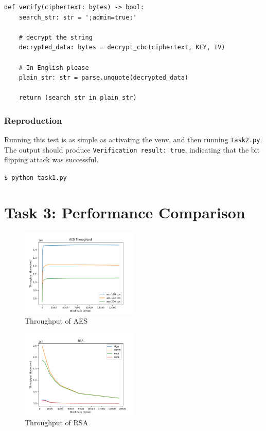 \documentclass[11pt]{article}
\begin{document}
\begin{framed}
\begin{verbatim}
def verify(ciphertext: bytes) -> bool:
    search_str: str = ';admin=true;'

    # decrypt the string  
    decrypted_data: bytes = decrypt_cbc(ciphertext, KEY, IV)

    # In English please
    plain_str: str = parse.unquote(decrypted_data)

    return (search_str in plain_str)

\end{verbatim}
\end{framed}

\subsubsection*{Reproduction}

Running this test is as simple as activating the venv, and then running \verb|task2.py|. The output should produce \verb|Verification result: true|, indicating that the bit flipping attack was successful.

\verb|$ python task1.py|

\section*{Task 3: Performance Comparison}
\begin{figure}[!ht]
	\centering
	\includegraphics[width=0.5\textwidth]{./assets/aes.png}
	\caption{Throughput of AES}
	\label{fig:aes}
\end{figure}

\begin{figure}[!ht]
	\centering
	\includegraphics[width=0.5\textwidth]{./assets/rsa.png}
	\caption{Throughput of RSA}
	\label{fig:rsa}
\end{figure}
\end{document}
